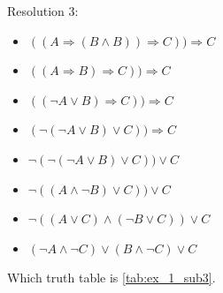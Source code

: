 \documentclass[10pt,a4paper]{article}
\begin{document}
Resolution 3:
\begin{itemize}
\item $((A\Rightarrow (B\wedge B))\Rightarrow C))\Rightarrow C$
\item $((A\Rightarrow  B)\Rightarrow C))\Rightarrow C$
\item $((\neg A\vee  B)\Rightarrow C))\Rightarrow C$
\item $(\neg (\neg A\vee  B)\vee C))\Rightarrow C$
\item $\neg (\neg (\neg A\vee  B)\vee C))\vee C$
\item $\neg ( ( A\wedge  \neg B)\vee C))\vee C$
\item $\neg ( ( A \vee C) \wedge( \neg B \vee C))\vee C$
\item $( \neg A \wedge \neg C) \vee  (  B \wedge \neg C) \vee C$

\end{itemize}
Which truth table is \ref{tab:ex_1_sub3}.
\end{document}
